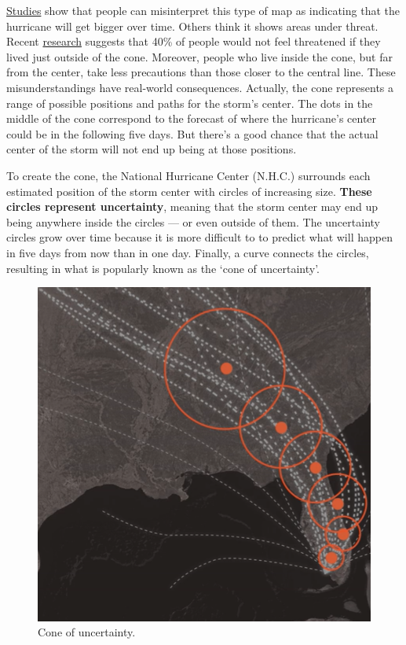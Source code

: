 \documentclass[
]{book}
\begin{document}
\href{https://www.semanticscholar.org/paper/Misinterpretations-of-the-\%E2\%80\%9CCone-of-Uncertainty\%E2\%80\%9D-in-Broad-Leiserowitz/f7c04b6eb883cf7d7fdee007cda056ed18182829}{Studies} show that people can misinterpret this type of map as indicating that the hurricane will get bigger over time. Others think it shows areas under threat. Recent \href{https://interactive.miami.edu/hurakan/}{research} suggests that 40\% of people would not feel threatened if they lived just outside of the cone. Moreover, people who live inside the cone, but far from the center, take less precautions than those closer to the central line. These misunderstandings have real-world consequences. Actually, the cone represents a range of possible positions and paths for the storm's center. The dots in the middle of the cone correspond to the forecast of where the hurricane's center could be in the following five days. But there's a good chance that the actual center of the storm will not end up being at those positions.

To create the cone, the National Hurricane Center (N.H.C.) surrounds each estimated position of the storm center with circles of increasing size. \textbf{These circles represent uncertainty}, meaning that the storm center may end up being anywhere inside the circles --- or even outside of them. The uncertainty circles grow over time because it is more difficult to to predict what will happen in five days from now than in one day. Finally, a curve connects the circles, resulting in what is popularly known as the `cone of uncertainty'.

\begin{figure}

{\centering \includegraphics[width=0.66\linewidth]{Figures/hurricane-forecast-maps} 

}

\caption{Cone of uncertainty.}\label{fig:hurricane-map}
\end{figure}
\end{document}
